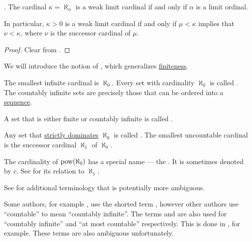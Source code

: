 \begin{corollary}\label{thm:weak_limit_cardinal_equivalences}.
  The cardinal \( \kappa = \aleph_\alpha \) is a weak limit cardinal if and only if \( \alpha \) is a limit ordinal.

  In particular, \( \kappa > 0 \) is a weak limit cardinal if and only if \( \mu < \kappa \) implies that \( \nu < \kappa \), where \( \nu \) is the successor cardinal of \( \mu \).
\end{corollary}
\begin{proof}
  Clear from .
\end{proof}

\begin{definition}\label{def:set_countability}
  We will introduce the notion of , which generalizes \hyperref[def:set_finiteness]{finiteness}.

  \begin{thmenum}
     The smallest infinite cardinal is \hyperref[thm:omega_is_a_cardinal]{\( \aleph_0 \)}. Every set with cardinality \( \aleph_0 \) is called . The countably infinite sets are precisely those that can be ordered into a \hyperref[def:sequence]{sequence}.

     A set that is either finite or countably infinite is called .

     Any set that \hyperref[def:equinumerosity]{strictly dominates} \( \aleph_0 \) is called . The smallest uncountable cardinal is the successor cardinal \( \aleph_1 \) of \( \aleph_0 \).

     The cardinality of \( \operatorname{pow}(\aleph_0) \) has a special name --- the . It is sometimes denoted by \( c \). See  for its relation to \( \aleph_1 \).
  \end{thmenum}

  See  for additional terminology that is potentially more ambiguous.
\end{definition}

\begin{remark}\label{rem:countability_etymology}
  Some authors, for example \cite[159]{Enderton1977Sets}, use the shorted term , however other authors use \enquote{countable} to mean \enquote{countably infinite}. The terms  and  are also used for \enquote{countably infinite} and \enquote{at most countable} respectively. This is done in \cite[def. 4.4]{OpenLogicFull}, for example. These terms are also ambiguous unfortunately.
\end{remark}

